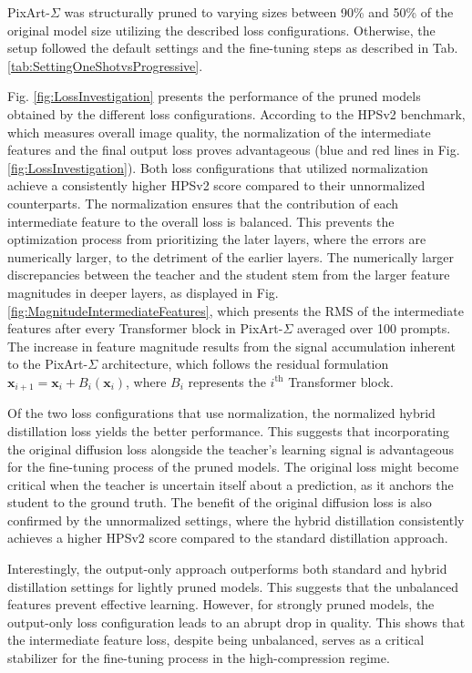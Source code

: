  
 PixArt-$\Sigma$ was structurally pruned to varying sizes between 90\% and 50\% of the original model size utilizing the described loss configurations. Otherwise, the setup followed the default settings and the fine-tuning steps as described in Tab. \ref{tab:SettingOneShotvsProgressive}.  
 
 Fig. \ref{fig:LossInvestigation} presents the performance of the pruned models obtained by the different loss configurations. According to the HPSv2 benchmark, which measures overall image quality, the normalization of the intermediate features and the final output loss proves advantageous (blue and red lines in Fig. \ref{fig:LossInvestigation}). Both loss configurations that utilized normalization achieve a consistently higher HPSv2 score compared to their unnormalized counterparts. The normalization ensures that the contribution of each intermediate feature to the overall loss is balanced. This prevents the optimization process from prioritizing the later layers, where the errors are numerically larger, to the detriment of the earlier layers. The numerically larger discrepancies between the teacher and the student stem from the larger feature magnitudes in deeper layers, as displayed in Fig. \ref{fig:MagnitudeIntermediateFeatures}, which presents the \gls{RMS} of the intermediate features after every Transformer block in PixArt-$\Sigma$ averaged over 100 prompts. The increase in feature magnitude results from the signal accumulation inherent to the PixArt-$\Sigma$ architecture, which follows the residual formulation $\mathbf{x}_{i+1} = \mathbf{x}_i + B_i(\mathbf{x}_i)$, where $B_i$ represents the $i^\text{th}$ Transformer block. 
 
Of the two loss configurations that use normalization, the normalized hybrid distillation loss yields the better performance. This suggests that incorporating the original diffusion loss alongside the teacher's learning signal is advantageous for the fine-tuning process of the pruned models. The original loss might become critical when the teacher is uncertain itself about a prediction, as it anchors the student to the ground truth. 
 The benefit of the original diffusion loss is also confirmed by the unnormalized settings, where the hybrid distillation consistently achieves a higher HPSv2 score compared to the standard distillation approach.
 
   Interestingly, the output-only approach outperforms both standard and hybrid distillation settings for lightly pruned models. This suggests that the unbalanced features prevent effective learning. However, for strongly pruned models, the output-only loss configuration leads to an abrupt drop in quality. This shows that the intermediate feature loss, despite being unbalanced, serves as a critical stabilizer for the fine-tuning process in the high-compression regime.
  
